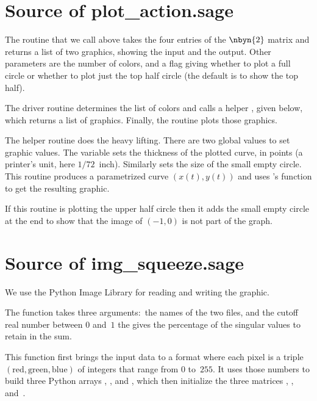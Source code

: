 \section{Source of plot\_action.sage}

The 
routine that we call above takes the four entries of the $\nbyn{2}$
matrix and returns a list of two graphics, showing the input and the
output.
Other parameters are the number of colors, and a flag giving whether
to plot a full circle or whether to plot just the top half circle (the 
default is to show the top half).

The driver routine determines the list of colors and 
calls a helper , 
given below, which returns a list of graphics.
Finally, the routine plots those graphics.


The helper routine does the heavy lifting.
There are two global values to set graphic values.
The variable  sets the thickness of 
the plotted curve, in points (a printer's unit, here $1/72$~inch).
Similarly  sets the size of the small empty circle.
This routine produces a parametrized curve $(x(t),y(t))$ and uses \Sage's
 function to get the resulting graphic.

If this routine is plotting the upper half circle then it adds the
small empty circle at the end to show that the image of $(-1,0)$
is not part of the graph.




\section{Source of img\_squeeze.sage}
We use the Python Image Library for reading and writing the graphic.

The function
takes three arguments:~the names of the two files, and
the cutoff real number between $0$ and~$1$ the gives the percentage 
of the singular values to retain in the sum.


This function first brings the input data to a format where each
pixel is a triple 
$(\text{red}, \text{green},\text{blue})$ of integers that range from 
$0$ to~$255$.
It uses those numbers to build 
three Python arrays , ,
and , which then initialize the 
three \Sage{} matrices ,
, and~.


